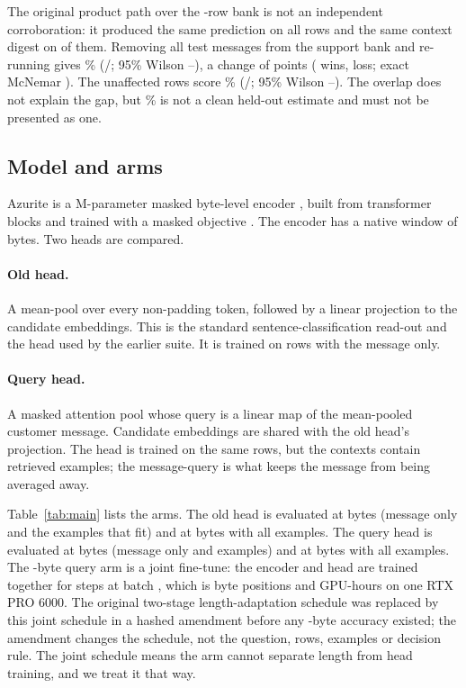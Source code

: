 \documentclass[11pt]{article}
\begin{document}
The original product path over the \PContamSupportRows{}-row bank is not an
independent corroboration: it produced the same prediction on all \PN{} rows and
the same context digest on \PContamProductFrozenSameContext{} of them. Removing
all \PContamSupportMatches{} test messages from the support bank and re-running
gives \PCleanAcc\%
(\PCleanCorrect/\PCleanN; 95\% Wilson \PCleanLo--\PCleanHi), a change of
\PCleanDiff{} points (\PCleanWins{} wins, \PCleanLosses{} loss; exact McNemar
\PCleanPText). The \PUnaffectedN{} unaffected rows score \PUnaffectedAcc\%
(\PUnaffectedCorrect/\PUnaffectedN; 95\% Wilson \PUnaffectedLo--\PUnaffectedHi).
The overlap does not explain the gap, but \PQueryTwoAcc\% is not a clean
held-out estimate and must not be presented as one.

\subsection{Model and arms}

Azurite is a \PParamsM{}M-parameter masked byte-level encoder
\citep{xue2022byt5,clark2022canine}, built from transformer blocks
\citep{vaswani2017attention} and trained with a masked objective
\citep{devlin2019bert}. The encoder has a native window of
\PNativeSeq{} bytes. Two heads are compared.

\paragraph{Old head.} A mean-pool over every non-padding token, followed by a
linear projection to the \PLabels{} candidate embeddings. This is the standard
sentence-classification read-out and the head used by the earlier suite. It is
trained on \PTrainN{} rows with the message only.

\paragraph{Query head.} A masked attention pool whose query is a linear map of
the mean-pooled customer message. Candidate embeddings are shared with the old
head's projection. The head is trained on the same \PTrainN{} rows, but the
contexts contain retrieved examples; the message-query is what keeps the
message from being averaged away.

Table~\ref{tab:main} lists the arms. The old head is evaluated at
\PNativeBudget{} bytes (message only and the examples that fit) and at
\PSeq{} bytes with all \PExamples{} examples. The query head is evaluated at
\PNativeBudget{} bytes (message only and examples) and at \PSeq{} bytes with
all \PExamples{} examples. The \PSeq{}-byte query arm is a joint fine-tune: the
encoder and head are trained together for \PSteps{} steps at batch \PBatch{},
which is \PTokens{} byte positions and \PGPUHours{} GPU-hours on one RTX PRO
6000. The original two-stage length-adaptation schedule was replaced by this
joint schedule in a hashed amendment before any \PSeq-byte accuracy existed;
the amendment changes the schedule, not the question, rows, examples or
decision rule. The joint schedule means the arm cannot separate length from
head training, and we treat it that way.
\end{document}
